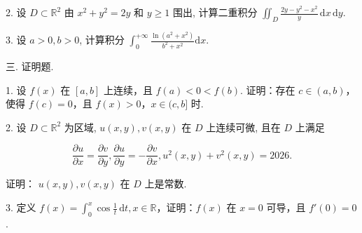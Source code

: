 \documentclass{examcollection}
\renewcommand{\displayformula}[1]{\[#1\]}
\begin{document}
{\begin{minipage}{\textwidth}
2. 设 $D \subset \mathbb{R}^2$ 由 $x^2 + y^2 = 2y$ 和 $y \geq 1$ 围出, 计算二重积分 $\iint_{D} \frac{2y - y^2 - x^2}{y} \, \mathrm{d}x \, \mathrm{d}y$.\par
3. 设 $a > 0, b > 0$, 计算积分 $\int_0^{+\infty} \frac{\ln(a^2 + x^2)}{b^2 + x^2} \mathrm{d}x$.\par
三. 证明题.\par
1. 设 $f(x)$ 在 $[a, b]$ 上连续，且 $f(a) < 0 < f(b)$. 证明：存在 $c \in (a, b)$，使得 $f(c) = 0$，且 $f(x) > 0$，$x \in (c, b]$ 时.\par
2. 设 $D \subset \mathbb{R}^2$ 为区域, $u(x, y), v(x, y)$ 在 $D$ 上连续可微, 且在 $D$ 上满足\par
\displayformula{\frac {\partial u}{\partial x} = \frac {\partial v}{\partial y}, \frac {\partial u}{\partial y} = - \frac {\partial v}{\partial x}, u ^ {2} (x, y) + v ^ {2} (x, y) = 2026.}\par
证明： $u(x,y),v(x,y)$ 在 $D$ 上是常数.\par
3. 定义 $f(x) = \int_0^x \cos \frac{1}{t} \, \mathrm{d}t, x \in \mathbb{R}$，证明：$f(x)$ 在 $x = 0$ 可导，且 $f'(0) = 0$.\par
\end{minipage}}
\ifdim\dimexpr\ht\proofbox+\dp\proofbox\relax>\textheight
\noindent\resizebox{!}{\textheight}{\usebox{\proofbox}}\else\noindent\usebox{\proofbox}\fi\clearpage
\end{document}
